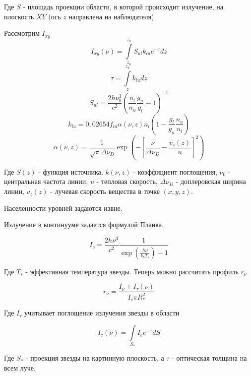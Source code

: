 \documentclass{article}
\begin{document}
Где $S$ - площадь проекции области, в которой происходит излучение, на плоскость $XY$ (ось $z$ направлена на наблюдателя) 

Рассмотрим $I_{xy}$
\begin{equation}
I_{xy}(\nu) =  \int \limits_{z_0}^{z_k} S_{ul}k_{lu}e^{-\tau}dz
\end{equation}
\begin{equation}
\tau = \int \limits_z^{z_k} k_{lu}dz
\end{equation}
\begin{equation}
S_{ul} = \frac{2h\nu_0^3}{c^2}\left(\frac{n_l}{n_u} \frac{g_u}{g_l} - 1 \right)^{-1}
\end{equation}
\begin{equation}
k_{lu} = 0,02654f_{lu}\alpha(\nu, z)n_l\left(1 - \frac{g_l}{g_u}\frac{n_u}{n_l}\right)
\end{equation}
\begin{equation}
\alpha(\nu, z) = \frac{1}{\sqrt{\pi} \Delta\nu_D} \exp\left( -\left[ \frac{\nu}{\Delta\nu_D} - \frac{v_z(z)}{u}\right]^2\right)
\end{equation}

Где $S(z)$ - функция источника, $k(\nu, z)$ - коэффициент поглощения, $\nu_0$ - центральная частота линии, $u$ - тепловая скорость, $\Delta\nu_D$ - доплеровская ширина линии, $v_z(z)$ - лучевая скорость вещества в точке $(x, y, z)$.

Населенности уровней задаются извне. 

Излучение в континууме задается формулой Планка.

\begin{equation}
I_c = \frac{2h\nu^3}{c^2}\frac{1}{\exp\left(\frac{h\nu}{k_bT_s}\right)-1}
\end{equation}

Где $T_s$ - эффективная температура звезды. Теперь можно рассчитать профиль $r_{\nu}$

\begin{equation}
r_{\nu} = \frac{I_\nu + I_{\tau}(\nu)}{I_c \pi R_\ast^2}
\end{equation}

Где $I_{\tau}$ учитывает поглощение излучения звезды в области

\begin{equation}
I_{\tau}(\nu) = \int \limits_{S_\ast} I_c e^{-\tau} dS
\end{equation}

Где $S_\ast$ - проекция звезды на картинную плоскость, а $\tau$ - оптическая толщина на всем луче.
\end{document}
